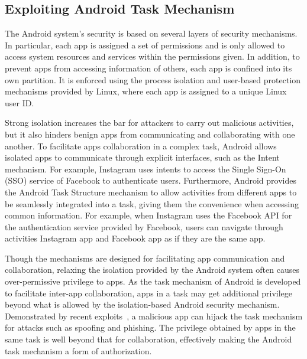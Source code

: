 \documentclass[letterpaper,12pt]{article}
\begin{document}
\subsection{Exploiting Android Task Mechanism}
The Android system's security is based on several layers of security
mechanisms. In particular, each app is assigned a set of permissions and is only allowed to access system resources and services within the
permissions given. In addition, to prevent apps from accessing
information of others, each app is confined into its own partition.
It is enforced using the process isolation and user-based protection
mechanisms provided by Linux, where each app is assigned to a unique
Linux user ID.

Strong isolation increases the bar for attackers to carry out
malicious activities, but it also hinders benign apps from
communicating and collaborating with one another. To facilitate apps
collaboration in a complex task, Android allows isolated apps to
communicate through explicit interfaces, such as the Intent
mechanism. For example, Instagram uses intents to access the Single
Sign-On (SSO) service of Facebook to authenticate users.  Furthermore,
Android provides the Android Task Structure mechanism to allow activities
from different apps to be seamlessly integrated into a task, giving
them the convenience when accessing common information. For example,
when Instagram uses the Facebook API for the authentication service
provided by Facebook, users can navigate through activities Instagram
app and Facebook app as if they are the same app.

Though the mechanisms are designed for facilitating app communication
and collaboration, relaxing the isolation provided by the Android
system often causes over-permissive privilege to apps. 
As the task mechanism of Android is developed to facilitate inter-app
collaboration, apps in a task may get additional privilege beyond what
is allowed by the isolation-based Android security
mechanism. Demonstrated by recent exploits~\cite{TaskHijacking}, a
malicious app can hijack the task mechanism for attacks such as
spoofing and phishing. The privilege obtained by apps in the same task
is well beyond that for collaboration, effectively making the Android
task mechanism a form of authorization.
\end{document}
